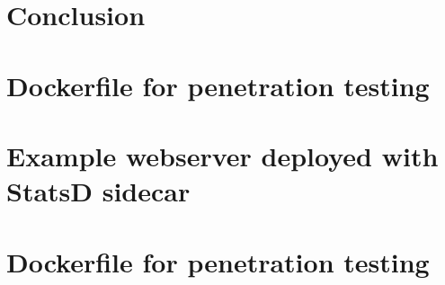 \documentclass[english, 12pt, a4paper, sci, utf8, a-2b, online]{aaltothesis}
\begin{document}

\clearpage

\section{Conclusion} \label{sec:conclusion}

\clearpage

\thesisbibliography
\printbibliography

\clearpage

\thesisappendix

\section{Dockerfile for penetration testing} \label{app:malicious-sidecar}



\clearpage

\section{Example webserver deployed with StatsD sidecar} \label{app:node-webapp}



\clearpage





\clearpage

\section{Dockerfile for penetration testing} \label{app:iptables-injector}


\end{document}
